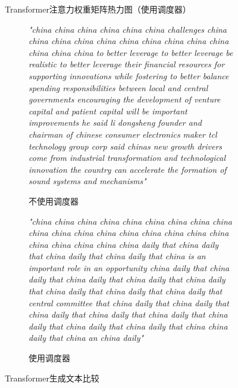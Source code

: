 \begin{figure}[H]
    \caption{Transformer注意力权重矩阵热力图（使用调度器）}
    \label{fig:transformerattentionweightswithscheduler}
\end{figure}

\begin{figure}[H]
    \centering
    \begin{subfigure}[b]{0.45\textwidth}
        \textit{"china china china china china china challenges china china china china china china china china china china china china china to better leverage to better leverage be realistic to better leverage their financial resources for supporting innovations while fostering to better balance spending responsibilities between local and central governments encouraging the development of venture capital and patient capital will be important improvements he said li dongsheng founder and chairman of chinese consumer electronics maker tcl technology group corp said chinas new growth drivers come from industrial transformation and technological innovation the country can accelerate the formation of sound systems and mechanisms"}
        \caption{不使用调度器}
        \label{fig:transformertextnoscheduler}
    \end{subfigure}
    \hfill
    \begin{subfigure}[b]{0.45\textwidth}
        \textit{"china china china china china china china china china china china china china china china china china china china china china china china daily that china daily that china daily that china daily that china is an important role in an opportunity china daily that china daily that china daily that china daily that china daily that china daily that china daily that china daily that central committee that china daily that china daily that china daily that china daily that china daily that china daily that china daily that china daily that china china daily that china an china daily"}
        \caption{使用调度器}
        \label{fig:transformertextwithscheduler}
    \end{subfigure}
    \caption{Transformer生成文本比较}
    \label{fig:transformer-comparison}
\end{figure}